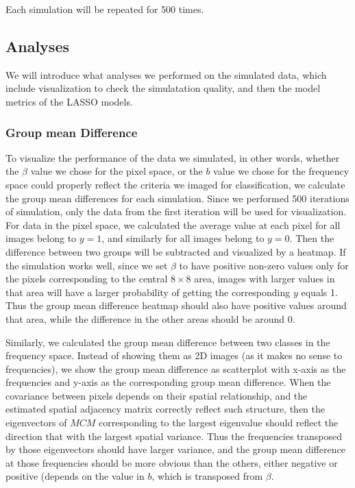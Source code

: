 \documentclass[12pt]{article}
\begin{document}
Each simulation will be repeated for 500 times.

\subsection{Analyses}

We will introduce what analyses we performed on the simulated data, which include visualization to check the simulatation quality, and then the model metrics of the LASSO models.

\subsubsection{Group mean Difference}

To visualize the performance of the data we simulated, in other words, whether the \( \beta \) value we chose for the pixel space, or the \( b \) value we chose for the frequency space could properly reflect the criteria we imaged for classification, we calculate the group mean differences for each simulation. Since we performed 500 iterations of simulation, only the data from the first iteration will be used for visualization. For data in the pixel space, we calculated the average value at each pixel for all images belong to \( y=1 \), and similarly for all images belong to \( y=0 \). Then the difference between two groups will be subtracted and visualized by a heatmap. If the simulation works well, since we set \( \beta \) to have positive non-zero values only for the pixels corresponding to the central \( 8 \times 8 \) area, images with larger values in that area will have a larger probability of getting the corresponding \( y \) equals 1. Thus the group mean difference heatmap should also have positive values around that area, while the difference in the other areas should be around 0.

Similarly, we calculated the group mean difference between two classes in the frequency space. Instead of showing them as 2D images (as it makes no sense to frequencies), we show the group mean difference as scatterplot with x-axis as the frequencies and y-axis as the corresponding group mean difference. When the covariance between pixels depends on their spatial relationship, and the estimated spatial adjacency matrix correctly reflect such structure, then the eigenvectors of \( M C M \) corresponding to the largest eigenvalue should reflect the direction that with the largest spatial variance. Thus the frequencies transposed by those eigenvectors should have larger variance, and the group mean difference at those frequencies should be more obvious than the others, either negative or positive (depends on the value in \( b \), which is transposed from \( \beta \). 
\end{document}
